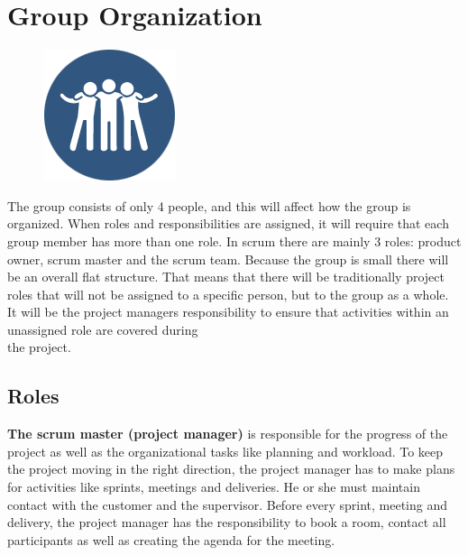 \clearpage
\section{Group Organization}

\begin{figure}
  \begin{center}
  \includegraphics[scale=0.72]{pictures/team.png}
  \end{center}
\end{figure}

The group consists of only 4 people, and this will affect how the group is organized. When roles and responsibilities are assigned, it will require that each group member has more than one role. In scrum there are mainly 3 roles: product owner, scrum master and the scrum team. Because the group is small there will be an overall flat structure. That means that
there will be traditionally project roles that will not be assigned to a specific person, but to the group as a whole. It will be the project managers responsibility to ensure that activities within an unassigned role are covered during \\ the project.

\subsection{Roles}

{\bf The scrum master (project manager)} is responsible for the progress of the
project as well as the organizational tasks like planning and workload. To keep
the project moving in the right direction, the project manager has to make plans
for activities like sprints, meetings and deliveries. He or she must maintain
contact with the customer and the supervisor. Before every sprint, meeting and
delivery, the project manager has the responsibility to book a room, contact all
participants as well as creating the agenda for the meeting. \\

